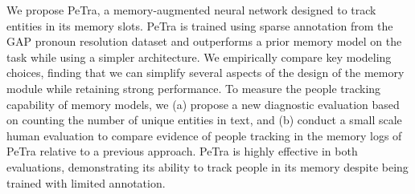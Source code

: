 We propose PeTra, a memory-augmented neural network designed to track entities in its memory slots. PeTra is trained using sparse annotation from the GAP pronoun resolution dataset and outperforms a prior memory model on the task while using a simpler architecture. We empirically compare key modeling choices, finding that we can simplify several aspects of the design of the memory module while retaining strong performance. To measure the people tracking capability of memory models, we (a) propose a new diagnostic evaluation based on counting the number of unique entities in text, and (b) conduct a small scale human evaluation to compare evidence of people tracking in the memory logs of PeTra relative to a previous approach. PeTra is highly effective in both evaluations, demonstrating its ability to track people in its memory despite being trained with limited annotation.
